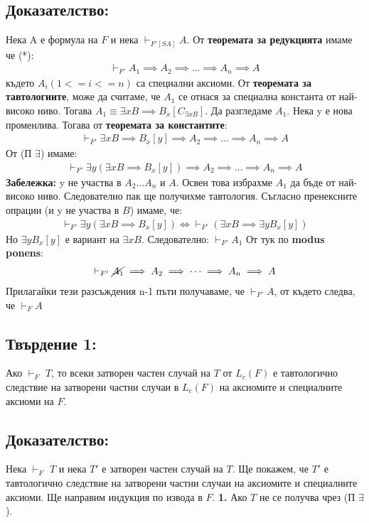 \documentclass[french]{article}
\begin{document}
\subsection*{Доказателство:}
Нека A е формула на $F$ и нека $\vdash_{F'[SA]} A$. От \textbf{теоремата за редукцията} имаме че (*):
\begin{align*}
\vdash_{F'} A_1 \implies A_2 \implies \dots \implies A_n \implies A
\end{align*}
където $A_i (1<= i <= n)$ са специални аксиоми. От \textbf{теоремата за тавтологиите}, може да считаме, че $A_1$ се отнася за специална константа от най-високо ниво. Тогава $A_1 \equiv \exists x B \implies B_x[C_ {\exists x B}]$. Да разгледаме $A_1$. Нека y е нова променлива. Тогава от \textbf{теоремата за константите}:
\begin{align*}
\vdash_{F'} \exists x B \implies B_x[y] \implies A_2 \implies \dots \implies A_n \implies A
\end{align*}
От (П $\exists$) имаме: 
\begin{align*}
\vdash_{F'} \exists y(\exists x B \implies B_x[y]) \implies A_2 \implies \dots \implies A_n \implies A
\end{align*}
\textbf{Забележка:} y не участва в $A_2 \dots A_n$ и $A$. Освен това избрахме $A_1$ да бъде от най-високо ниво. Следователно пак ще получихме тавтология. \newline
Съгласно пренексните опрации (и y не участва в $B$) имаме, че:
\begin{align*}
\vdash_{F'} \exists y(\exists x B \implies B_x[y]) \iff \vdash_{F'} (\exists x B \implies \exists y B_x[y]) 
\end{align*}
Но $ \exists y B_x[y]$ е вариант на $\exists x B$. Следователно: $\vdash_{F'} A_1$ От тук по \textbf{modus ponens}:
\begin{align*}
\vdash_{F'} \cancel{A_1} \implies A_2 \implies \dots \implies A_n \implies A
\end{align*}
Прилагайки тези разсъждения n-1 пъти получаваме, че $\vdash_{F'} A$, от където следва, че $\vdash_{F} A$

\subsection*{Твърдение 1:} Ако $\vdash_F$ $T$, то всеки затворен частен случай на $T$ от $L_c(F)$ е тавтологично следствие на затворени частни случаи в $L_c(F)$ на аксиомите и специалните аксиоми на $F$. 
\subsection*{Доказателство:} 
Нека $\vdash_F$ $T$ и нека $T'$ е затворен частен случай на $T$. \newline Ще покажем, че $T'$ е тавтологично следствие на затворени частни случаи на аксиомите и специалните аксиоми. Ще направим индукция по извода в $F$.
\newline\newline
\textbf{1.} Ако $T$ не се получва чрез (П $\exists$).
\end{document}
